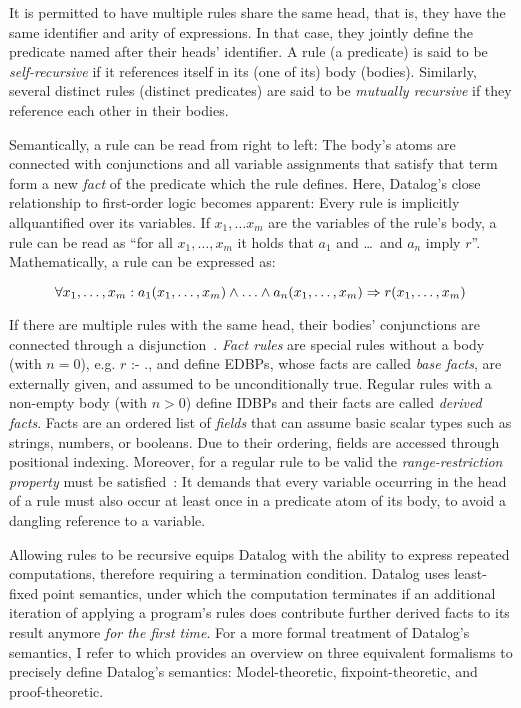 It is permitted to have multiple rules share the same head, that is,
they have the same identifier and arity of expressions.
In that case, they jointly define the predicate named after their heads' identifier.
A rule (a predicate) is said to be \emph{self-recursive}
if it references itself in its (one of its) body (bodies).
Similarly, several distinct rules (distinct predicates) are said to be
\emph{mutually recursive} if they reference each other in their bodies.

Semantically, a rule can be read from right to left: The body's atoms are
connected with conjunctions and all variable assignments that satisfy that term
form a new \emph{fact} of the predicate which the rule defines.
Here, Datalog's close relationship to first-order logic becomes apparent:
Every rule is implicitly allquantified over its variables.
If \(x_1, \ldots x_m\) are the variables of the rule's body, a rule can be read as
``for all \(x_1, \ldots, x_m\) it holds that \(a_1\) and \ldots\ and \(a_n\) imply \(r\)''.
Mathematically, a rule can be expressed as\footnotemark{}:


\begin{equation}
    \forall x_1, \ldots, x_m: a_1(x_1, \ldots, x_m) \land \ldots \land a_n(x_1, \ldots, x_m) \Rightarrow r(x_1, \ldots, x_m) \\
\end{equation}

If there are multiple rules with the same head, their bodies' conjunctions
are connected through a disjunction~\cite{abo2024convergence}.
\emph{Fact rules} are special rules without a body (with $n=0$), e.g.
\( r \text{ :- } .\), and define \acp{EDBP}, whose facts are called
\emph{base facts}, are externally given, and assumed to be unconditionally true.
Regular rules with a non-empty body (with $n>0$) define \acp{IDBP}
and their facts are called \emph{derived facts}.
Facts are an ordered list of \emph{fields} that can assume basic scalar
types such as strings, numbers, or booleans.
Due to their ordering, fields are accessed through positional indexing.
Moreover, for a regular rule to be valid the \emph{range-restriction property}
must be satisfied~\cite{green2013datalog}:
It demands that every variable occurring in the head of a rule must also occur
at least once in a predicate atom of its body, to avoid a dangling reference
to a variable.

Allowing rules to be recursive equips Datalog with the ability to express
repeated computations, therefore requiring a termination condition.
Datalog uses least-fixed point semantics, under which the computation terminates
if an additional iteration of applying a program's rules does contribute further
derived facts to its result anymore \emph{for the first time}.
For a more formal treatment of Datalog's semantics, I refer to \cite{green2013datalog}
which provides an overview on three equivalent formalisms to precisely define
Datalog's semantics: Model-theoretic, fixpoint-theoretic, and proof-theoretic.

